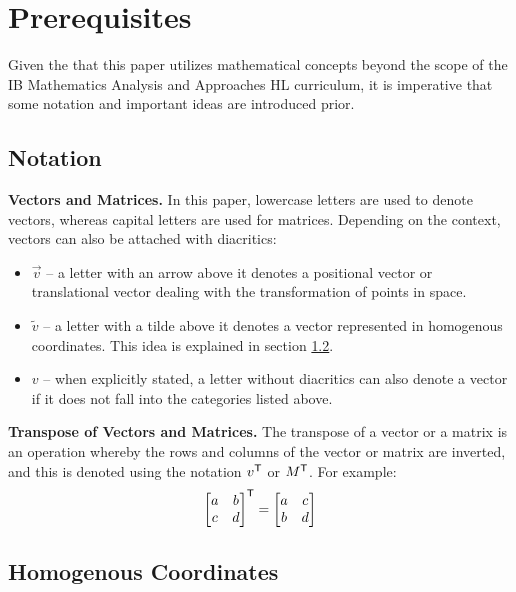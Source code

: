 \section{Prerequisites}

Given the that this paper utilizes mathematical concepts beyond the scope of the IB Mathematics Analysis and Approaches HL curriculum, it is imperative that some notation and important ideas are introduced prior.

\subsection{Notation}
\noindent\textbf{Vectors and Matrices.} In this paper, lowercase letters are used to denote vectors, whereas capital letters are used for matrices. Depending on the context, vectors can also be attached with diacritics:
\begin{itemize}[leftmargin=!, itemindent=-4ex]
    \item \textbf{$\vec{v}$} -- a letter with an arrow above it denotes a positional vector or translational vector dealing with the transformation of points in space.
    \item \textbf{$\widetilde{v}$} -- a letter with a tilde above it denotes a vector represented in homogenous coordinates. This idea is explained in section \ref{sec:homogenous}.
    \item \textbf{$v$} -- when explicitly stated, a letter without diacritics can also denote a vector if it does not fall into the categories listed above. 
\end{itemize}

\noindent\textbf{Transpose of Vectors and Matrices.} The transpose of a vector or a matrix is an operation whereby the rows and columns of the vector or matrix are inverted, and this is denoted using the notation $v^{\mathsf{T}}$ or $M^{\mathsf{T}}$. For example:
\[
    \begin{bmatrix}
        a & b \\
        c & d
    \end{bmatrix}^{\mathsf{T}}
    =
    \begin{bmatrix}
        a & c \\
        b & d
    \end{bmatrix}
\]

\subsection{Homogenous Coordinates} \label{sec:homogenous}

